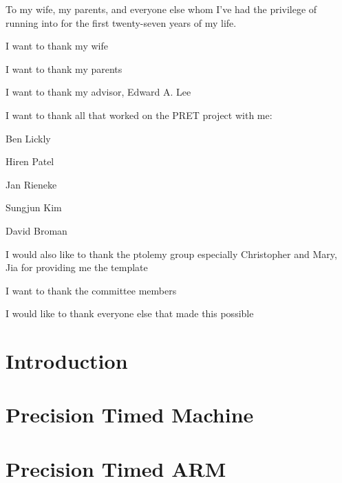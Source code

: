 \documentclass[11pt]{ucthesis}
\begin{document}
\begin{frontmatter}

\begin{dedication}
\null\vfil
{\large
\begin{center}
To my wife, my parents, and everyone else whom I've had the privilege of running into for the first twenty-seven years of my life.
\end{center}}
\vfil\null
\end{dedication}


\begin{acknowledgements}

I want to thank my wife

I want to thank my parents

I want to thank my advisor, Edward A. Lee

I want to thank all that worked on the PRET project with me:

Ben Lickly

Hiren Patel

Jan Rieneke

Sungjun Kim

David Broman

I would also like to thank the ptolemy group especially Christopher and Mary, Jia for providing me the template

I want to thank the committee members

I would like to thank everyone else that made this possible

\end{acknowledgements}

\tableofcontents
\listoffigures
\listoftables

\end{frontmatter}

\chapter{Introduction}
\label{chapter:intro}


\chapter{Precision Timed Machine}
\label{chapter:pret}


\chapter{Precision Timed ARM}
\label{chapter:ptarm}

\end{document}
